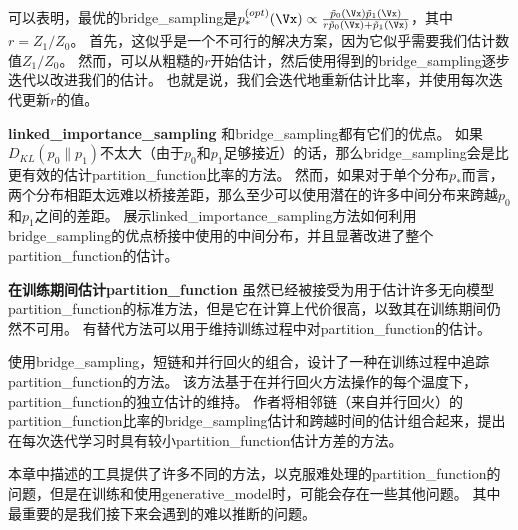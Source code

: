 可以表明，最优的\gls{bridge_sampling}是$p_*^{(opt)} (\Vx) \propto \frac{ \tilde{p}_0(\Vx) \tilde{p}_1(\Vx) }{ r\tilde{p}_0(\Vx) + \tilde{p}_1(\Vx) }$，其中$r = Z_1 / Z_0$。
首先，这似乎是一个不可行的解决方案，因为它似乎需要我们估计数值$Z_1 / Z_0$。
然而，可以从粗糙的$r$开始估计，然后使用得到的\gls{bridge_sampling}逐步迭代以改进我们的估计\citep{Neal05estimatingratios}。
也就是说，我们会迭代地重新估计比率，并使用每次迭代更新$r$的值。


\textbf{\gls{linked_importance_sampling}}
和\gls{bridge_sampling}都有它们的优点。
如果$D_{KL}(p_0 \| p_1)$不太大（由于$p_0$和$p_1$足够接近）的话，那么\gls{bridge_sampling}会是比更有效的估计\gls{partition_function}比率的方法。
然而，如果对于单个分布$p_*$而言，两个分布相距太远难以桥接差距，那么至少可以使用潜在的许多中间分布来跨越$p_0$和$p_1$之间的差距。
\cite{Neal05estimatingratios}展示\gls{linked_importance_sampling}方法如何利用\gls{bridge_sampling}的优点桥接中使用的中间分布，并且显著改进了整个\gls{partition_function}的估计。


\textbf{在训练期间估计\gls{partition_function}}
虽然已经被接受为用于估计许多无向模型\gls{partition_function}的标准方法，但是它在计算上代价很高，以致其在训练期间仍然不可用。
有替代方法可以用于维持训练过程中对\gls{partition_function}的估计。


使用\gls{bridge_sampling}，短链和并行回火的组合，\cite{Desjardins+al-NIPS2011}设计了一种在训练过程中追踪\gls{partition_function}的方法。
该方法基于在并行回火方法操作的每个温度下，\gls{partition_function}的独立估计的维持。
作者将相邻链（来自并行回火）的\gls{partition_function}比率的\gls{bridge_sampling}估计和跨越时间的估计组合起来，提出在每次迭代学习时具有较小\gls{partition_function}估计方差的方法。


本章中描述的工具提供了许多不同的方法，以克服难处理的\gls{partition_function}的问题，但是在训练和使用\gls{generative_model}时，可能会存在一些其他问题。
其中最重要的是我们接下来会遇到的难以推断的问题。

